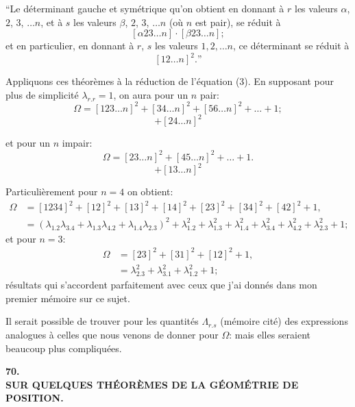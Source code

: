 \documentclass[11pt]{article}
\begin{document}
\medskip

``Le d\'eterminant gauche et sym\'etrique qu'on obtient en donnant \`a $r$ les valeurs
$\alpha$, $2$, $3$, $\ldots n$, et \`a $s$ les valeurs $\beta$, $2$, $3$, $\ldots n$ (o\`u $n$ est pair), se r\'eduit \`a
\[
[\alpha 23\ldots n]\cdot[\beta 23\ldots n];
\]
et en particulier, en donnant \`a $r$, $s$ les valeurs $1, 2, \ldots n$, ce d\'eterminant se r\'eduit \`a
\[
[12\ldots n]^{2}.\text{''}
\]

\medskip

Appliquons ces th\'eor\`emes \`a la r\'eduction de l'\'equation (3). En supposant pour
plus de simplicit\'e $\lambda_{r.r} = 1$, on aura pour un $n$ pair:
\[
\Omega = [123\ldots n]^{2} + [34\ldots n]^{2} + [56\ldots n]^{2} + \ldots + 1;
\]
\[
+ [24\ldots n]^{2}
\]

\vfill\pagebreak

et pour un $n$ impair:
\[
\Omega = [23\ldots n]^{2} + [45\ldots n]^{2} + \ldots + 1.
\]
\[
+ [13\ldots n]^{2}
\]

\medskip

Particuli\`erement pour $n = 4$ on obtient:
\begin{align*}
\Omega &= [1234]^{2} + [12]^{2} + [13]^{2} + [14]^{2} + [23]^{2} + [34]^{2} + [42]^{2} + 1,\\
&= (\lambda_{1.2}\lambda_{3.4} + \lambda_{1.3}\lambda_{4.2} + \lambda_{1.4}\lambda_{2.3})^{2} + \lambda_{1.2}^{2} + \lambda_{1.3}^{2} + \lambda_{1.4}^{2} + \lambda_{3.4}^{2} + \lambda_{4.2}^{2} + \lambda_{2.3}^{2} + 1;
\end{align*}
et pour $n = 3$:
\begin{align*}
\Omega &= [23]^{2} + [31]^{2} + [12]^{2} + 1,\\
&= \lambda_{2.3}^{2} + \lambda_{3.1}^{2} + \lambda_{1.2}^{2} + 1;
\end{align*}
r\'esultats qui s'accordent parfaitement avec ceux que j'ai donn\'es dans mon premier
m\'emoire sur ce sujet.

\medskip

Il serait possible de trouver pour les quantit\'es $\Lambda_{r.s}$ (m\'emoire cit\'e) des expressions
analogues \`a celles que nous venons de donner pour $\Omega$: mais elles seraient beaucoup plus
compliqu\'ees.

\vfill\pagebreak

\begin{center}
\textbf{\Large 70.}\\[1em]
\textbf{\large SUR QUELQUES TH\'EOR\`EMES DE LA G\'EOM\'ETRIE DE POSITION.}
\end{center}
\end{document}

